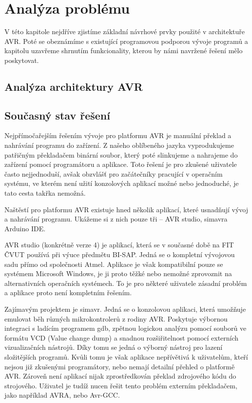 \chapter{Analýza problému}

V této kapitole nejdříve zjistíme základní návrhové prvky použité v architektuře AVR. Poté se obeznámíme s existující programovou podporou vývoje programů a kapitolu uzavřeme shrnutím funkcionality, kterou by námi navržené řešení mělo poskytovat.

\section{Analýza architektury AVR}


\section{Současný stav řešení}

Nejpřímočařejším řešením vývoje pro platformu AVR je manuální překlad a nahrávání programu do zařízení. Z našeho oblíbeného jazyka vyprodukujeme patřičným překladačem binární soubor, který poté slinkujeme a nahrajeme do zařízení pomocí programátoru a aplikace. Toto řešení je pro zkušené uživatele často nejjednoduší, avšak obzvlášť pro začátečníky pracující v operačním systému, ve kterém není užití konzolových aplikací možné nebo jednoduché, je tato cesta takřka nemožná.

Naštěstí pro platformu AVR existuje hned několik aplikací, které usnadňují vývoj a nahrávání programu. Ukážeme si z nich pouze tři -- AVR studio\todocite, simavr\todocite a Arduino IDE\todocite.

AVR studio (konkrétně verze 4) je aplikací, která se v současné době na FIT ČVUT používá při výuce předmětu BI-SAP\todocite. Jedná se o kompletní vývojovou sadu přímo od společnosti Atmel\todocite. Aplikace je však kompatibilní pouze se systémem Microsoft Windows\todocite, je ji proto těžké nebo nemožné zprovoznit na alternativních operačních systémech. To je pro některé uživatele zásadní problém a aplikace proto není kompletním řešením.


Zajímavým projektem je simavr\todocite. Jedná se o konzolovou aplikaci, která umožňuje emulovat běh různých mikrokontrolerů z rodiny AVR. Poskytuje výbornou integraci s ladícím programem gdb, zpětnou logickou analýzu pomocí souborů ve formátu VCD (Value change dump) a snadnou rozšiřitelnost pomocí externích vizualizačních nástrojů. Díky tomu se jedná o výborný nástroj pro lazení složitějších programů. Kvůli tomu je však aplikace nepřívětivá k uživatelům, kteří nejsou již zkušenými programátory, nebo nemají detailní přehled o platformě AVR. Zároveň není aplikací nijak zprostředkován překlad zdrojového kódu do strojového. Uživatel je tudíž nucen řešit tento problém externím překladačem, jako například AVRA\todocite, nebo Avr-GCC\todocite.


